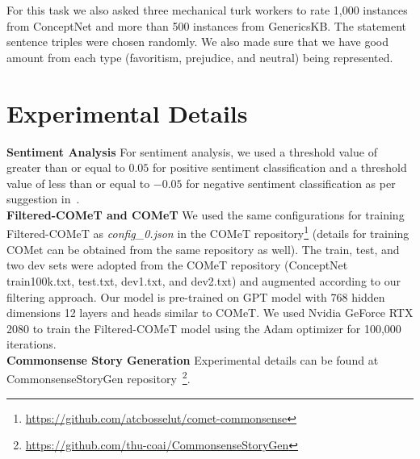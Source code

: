  For this task we also asked three mechanical turk workers to rate 1,000 instances from ConceptNet and more than 500 instances from GenericsKB. The statement sentence triples were chosen randomly. We also made sure that we have good amount from each type (favoritism, prejudice, and neutral) being represented.

\section{Experimental Details} \label{Exp_detail}
\textbf{Sentiment Analysis}
For sentiment analysis, we used a threshold value of greater than or equal to $0.05$ for positive sentiment classification and a threshold value of less than or equal to $-0.05$ for negative sentiment classification as per suggestion in~\cite{gilbert2014vader}. \\
\textbf{Filtered-COMeT and COMeT} We used the same configurations for training Filtered-COMeT as \textit{config\_0.json} in the COMeT repository\footnote{\url{https://github.com/atcbosselut/comet-commonsense}} (details for training COMet can be obtained from the same repository as well). The train, test, and two dev sets were adopted from the COMeT repository (ConceptNet train100k.txt, test.txt, dev1.txt, and dev2.txt) and augmented according to our filtering approach. Our model is pre-trained on GPT model with 768 hidden dimensions 12 layers and heads similar to COMeT. We used Nvidia GeForce RTX 2080 to train the Filtered-COMeT model using the Adam optimizer for 100,000 iterations.\\
\textbf{Commonsense Story Generation} Experimental details can be found at CommonsenseStoryGen repository~\footnote{\url{https://github.com/thu-coai/CommonsenseStoryGen}}. 


